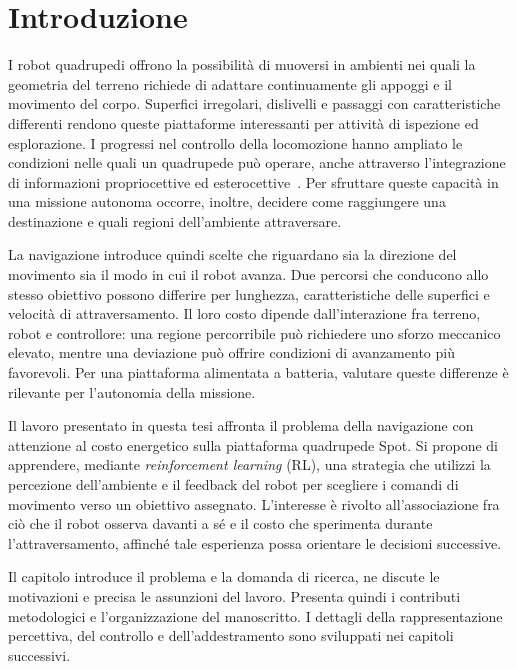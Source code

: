 \chapter{Introduzione}
\label{chap:introduction}

I robot quadrupedi offrono la possibilità di muoversi in ambienti nei quali la geometria del terreno richiede di adattare continuamente gli appoggi e il movimento del corpo. Superfici irregolari, dislivelli e passaggi con caratteristiche differenti rendono queste piattaforme interessanti per attività di ispezione ed esplorazione. I progressi nel controllo della locomozione hanno ampliato le condizioni nelle quali un quadrupede può operare, anche attraverso l'integrazione di informazioni propriocettive ed esterocettive~\citep{Miki2022Perceptive}. Per sfruttare queste capacità in una missione autonoma occorre, inoltre, decidere come raggiungere una destinazione e quali regioni dell'ambiente attraversare.

La navigazione introduce quindi scelte che riguardano sia la direzione del movimento sia il modo in cui il robot avanza. Due percorsi che conducono allo stesso obiettivo possono differire per lunghezza, caratteristiche delle superfici e velocità di attraversamento. Il loro costo dipende dall'interazione fra terreno, robot e controllore: una regione percorribile può richiedere uno sforzo meccanico elevato, mentre una deviazione può offrire condizioni di avanzamento più favorevoli. Per una piattaforma alimentata a batteria, valutare queste differenze è rilevante per l'autonomia della missione.

Il lavoro presentato in questa tesi affronta il problema della navigazione con attenzione al costo energetico sulla piattaforma quadrupede Spot. Si propone di apprendere, mediante \emph{reinforcement learning} (RL), una strategia che utilizzi la percezione dell'ambiente e il feedback del robot per scegliere i comandi di movimento verso un obiettivo assegnato. L'interesse è rivolto all'associazione fra ciò che il robot osserva davanti a sé e il costo che sperimenta durante l'attraversamento, affinché tale esperienza possa orientare le decisioni successive.

Il capitolo introduce il problema e la domanda di ricerca, ne discute le motivazioni e precisa le assunzioni del lavoro. Presenta quindi i contributi metodologici e l'organizzazione del manoscritto. I dettagli della rappresentazione percettiva, del controllo e dell'addestramento sono sviluppati nei capitoli successivi.

